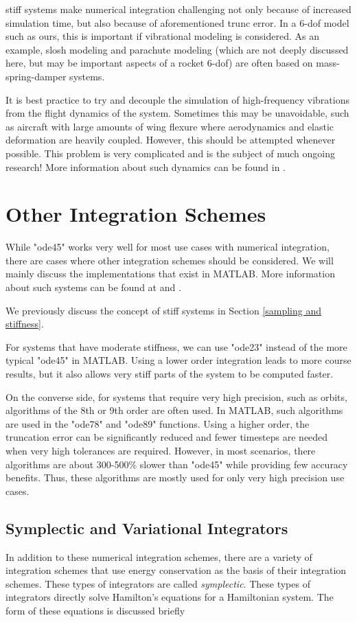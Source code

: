 \documentclass[12pt]{report}
\begin{document}
\Gls{stiff} systems make numerical integration challenging not only because of increased simulation time, but also because of aforementioned \gls{trunc error}. In a 6-\gls{dof} model such as ours, this is important if vibrational modeling is considered. As an example, slosh modeling and parachute modeling (which are not deeply discussed here, but may be important aspects of a rocket 6-\gls{dof}) are often based on mass-spring-damper systems.

It is best practice to try and decouple the simulation of high-frequency vibrations from the flight dynamics of the system. Sometimes this may be unavoidable, such as aircraft with large amounts of wing flexure where aerodynamics and elastic deformation are heavily coupled. However, this should be attempted whenever possible. This problem is very complicated and is the subject of much ongoing research! More information about such dynamics can be found in \cite{shyy_recent_2010}.
\section{Other Integration Schemes}
While "ode45" works very well for most use cases with numerical integration, there are cases where other integration schemes should be considered. We will mainly discuss the implementations that exist in MATLAB. More information about such systems can be found at \cite{mathworks_choose_2024} and \cite{mathworks_summary_2024}.

We previously discuss the concept of \gls{stiff} systems in Section \ref{sampling and stiffness}. 

For systems that have moderate stiffness, we can use "ode23" instead of the more typical "ode45" in MATLAB. Using a lower order integration leads to more course results, but it also allows very stiff parts of the system to be computed faster.

On the converse side, for systems that require very high precision, such as orbits, algorithms of the 8th or 9th order are often used. In MATLAB, such algorithms are used in the "ode78" and "ode89" functions. Using a higher order, the truncation error can be significantly reduced and fewer timesteps are needed when very high tolerances are required. However, in most scenarios, there algorithms are about 300-500\% slower than "ode45" while providing few accuracy benefits. Thus, these algorithms are mostly used for only very high precision use cases.

\subsection{Symplectic and Variational Integrators}
In addition to these numerical integration schemes, there are a variety of integration schemes that use energy conservation as the basis of their integration schemes. These types of integrators are called \textit{symplectic}. These types of integrators directly solve Hamilton's equations for a Hamiltonian system. The form of these equations is discussed briefly 
\end{document}
